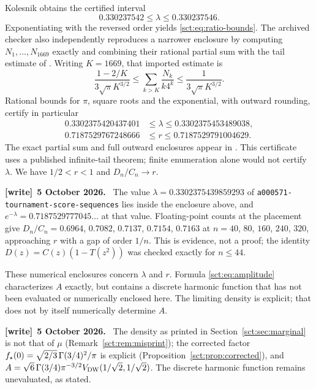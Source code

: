 \documentclass[11pt,letterpaper]{article}
\newcommand{\file}[1]{\nolinkurl{#1}}
\theoremstyle{definition}\newtheorem{remark}[theorem]{Remark}
\newenvironment{writenote}[1][]{\par\smallskip\begingroup\small
 \noindent\textbf{[write]}\if\relax\detokenize{#1}\relax\else~\textbf{#1.}\fi\ }%
 {\par\endgroup\smallskip}
\begin{document}
Kolesnik \cite[Section 3.1, equation (8)]{kolesnik} obtains the certified interval
\begin{equation}\label{sct:eq:published-lambda}
 0.330237542\le\lambda\le0.330237546.
\end{equation}
Exponentiating with the reversed order yields \eqref{sct:eq:ratio-bounds}.
The archived checker also independently reproduces a narrower enclosure by
computing $N_1,\ldots,N_{1669}$ exactly and combining their rational partial
sum with the tail estimate of \cite[Lemma 11, equation (17)]{kolesnik}.
Writing $K=1669$, that imported estimate is
\[
 \frac{1-2/K}{3\sqrt\pi K^{3/2}}
 \le \sum_{k>K}\frac{N_k}{k4^k}
 \le \frac1{3\sqrt\pi K^{3/2}}.
\]
Rational bounds for $\pi$, square roots and the exponential, with outward
rounding, certify in particular
\begin{align*}
 0.3302375420437401&\le\lambda\le0.3302375453489038,\\
 0.7187529767248666&\le r\le0.7187529791004629.
\end{align*}
The exact partial sum and full outward enclosures appear in
. This certificate uses a published infinite-tail
theorem; finite enumeration alone would not certify $\lambda$. We have
$1/2<r<1$ and $D_n/C_n\to r$.
\begin{writenote}[5 October 2026]
The value $\lambda=0.3302375439859293$ of \file{a000571-tournament-score-sequences} lies inside the enclosure above, and $e^{-\lambda}=0.7187529777045\ldots$ at that value. Floating-point counts at the placement give $D_n/C_n=0.6964$, $0.7082$, $0.7137$, $0.7154$, $0.7163$ at $n=40$, $80$, $160$, $240$, $320$, approaching $r$ with a gap of order $1/n$. This is evidence, not a proof; the identity $D(z)=C(z)(1-T(z^2))$ was checked exactly for $n\le44$.
\end{writenote}

These numerical enclosures concern $\lambda$ and $r$. Formula
\eqref{sct:eq:amplitude} characterizes $A$ exactly, but contains a discrete harmonic
function that has not been evaluated or numerically enclosed here. The
limiting density is explicit; that does not by itself numerically determine
$A$.
\begin{writenote}[5 October 2026]
The density as printed in Section~\ref{sct:sec:marginal} is not that of $\mu$ (Remark~\ref{sct:rem:misprint}); the corrected factor $f_\star(0)=\sqrt{2/3}\,\Gamma(3/4)^2/\pi$ is explicit (Proposition~\ref{sct:prop:corrected}), and $A=\sqrt6\,\Gamma(3/4)\pi^{-3/2}V_{\mathrm{DW}}(1/\sqrt2,1/\sqrt2)$. The discrete harmonic function remains unevaluated, as stated.
\end{writenote}
\end{document}
